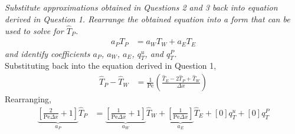 \section{}
\textit{Substitute approximations obtained in Questions 2 and 3 back into equation derived in Question 1. Rearrange the obtained equation into a form that can be used to solve for $\hat{T}_P$.}
\begin{align*}
    a_P T_P &= a_W T_W + a_E T_E 
\end{align*}
\textit{and identify coefficients $a_P$, $a_W$, $a_E$, $q_{T}^{u}$, and $q_{T}^{P}$.} \\

Substituting back into the equation derived in Question 1,
\begin{align*}
    \hat{T}_P - \hat{T}_W &= \frac{1}{\text{Pe}} \left(\frac{\hat{T}_E - 2\hat{T}_P + \hat{T}_W}{\Delta x}\right) 
\end{align*}
Rearranging,
\begin{align*}
    \underbrace{\left[\frac{2}{\text{Pe}\Delta x} + 1\right]}_{a_P}\hat{T}_P &= \underbrace{\left[\frac{1}{\text{Pe}\Delta x} + 1\right]}_{a_W}\hat{T}_W + \underbrace{\left[\frac{1}{\text{Pe}\Delta x}\right]}_{a_E}\hat{T}_E + [0] q_{T}^{u} + [0] q_{T}^{P}
\end{align*}